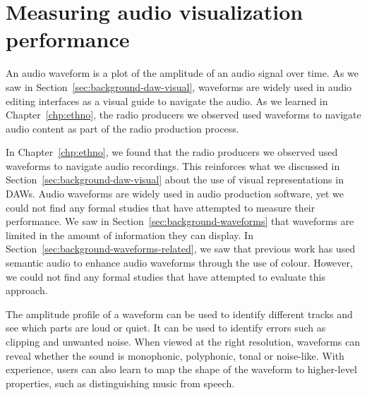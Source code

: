 \chapter{Measuring audio visualization performance}\label{chp:colourised}

An audio waveform is a plot of the amplitude of an audio signal over time. As we saw in
Section~\ref{sec:background-daw-visual}, waveforms are widely used in audio editing interfaces as a visual guide to
navigate the audio. As we learned in Chapter~\ref{chp:ethno}, the radio producers we observed used waveforms to
navigate audio content as part of the radio production process.


In Chapter~\ref{chp:ethno}, we found that the radio producers we observed used waveforms to navigate audio recordings.
This reinforces what we discussed in Section~\ref{sec:background-daw-visual} about the use of visual representations in
DAWs. Audio waveforms are widely used in audio production software, yet we could not find any formal studies that have
attempted to measure their performance. We saw in Section~\ref{sec:background-waveforms} that waveforms are limited in
the amount of information they can display. In Section~\ref{sec:background-waveforms-related}, we saw that previous
work has used semantic audio to enhance audio waveforms through the use of colour. However, we could not find any
formal studies that have attempted to evaluate this approach.

The amplitude profile of a waveform can be used to identify different tracks and see which parts are loud or quiet. It
can be used to identify errors such as clipping and unwanted noise. When viewed at the right resolution, waveforms can
reveal whether the sound is monophonic, polyphonic, tonal or noise-like.  With experience, users can also learn to
map the shape of the waveform to higher-level properties, such as distinguishing music from speech.

